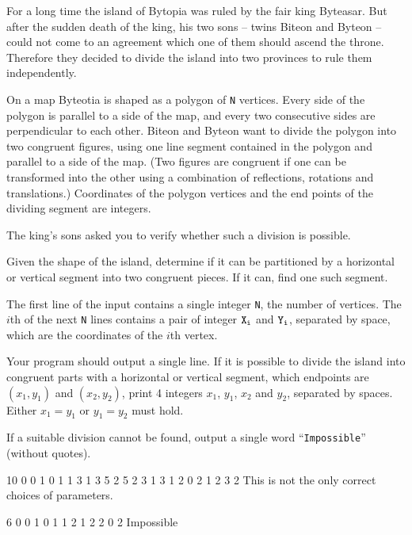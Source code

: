 \documentclass{boi2014}
\newcommand{\param}[1]{{\tt #1}}
\newcommand{\constant}[1]{{\tt #1}}
\newcommand{\N}{\param{N}}
\begin{document}
    For a long time the island of Bytopia was ruled by the fair king
    Byteasar. But after the sudden death
    of the king, his two sons -- twins Biteon and Byteon -- could
    not come to an agreement which one of them should ascend the throne.
    Therefore they decided to divide the island into two provinces to
    rule them independently.  
 
    On a map Byteotia is shaped as a polygon of \N{} vertices. Every
    side of the polygon is parallel to a side of the map, and every
    two consecutive sides are perpendicular to each other.  Biteon
    and Byteon want to divide the polygon into two congruent figures,
    using one line segment contained in the polygon and parallel to a
    side of the map.  (Two figures are congruent if one can be transformed
    into the other using a combination of reflections, rotations and
    translations.) Coordinates of the polygon vertices and the end points
    of the dividing segment are integers.  
 
    The king's sons asked you to verify whether such a division is
    possible.

    \Task

    Given the shape of the island, determine if it can be partitioned
    by a horizontal or vertical segment into two congruent pieces. If
    it can, find one such segment.

    \Input
	The first line of the input contains a single integer \N{}, the number of
	vertices. The $i$th of the next \N{} lines contains a pair of integer
	$\param{X_i}$ and $\param{Y_i}$, separated by space, which are the
	coordinates of the $i$th vertex.

	\Output
	Your program should output a single line. If it is possible to divide the
	island into congruent parts with a horizontal or vertical segment, which
	endpoints are $(x_1, y_1)$ and $(x_2, y_2)$, print 4 integers $x_1$,
	$y_1$, $x_2$ and $y_2$, separated by spaces.
	Either $x_1 = y_1$ or $y_1 = y_2$ must hold.

	If a suitable division cannot be found, output a single word
	``\constant{Impossible}'' (without quotes).

    \Examples
	\example
	{
		10
		0 0
		1 0
		1 1
		3 1
		3 5
		2 5
		2 3
		1 3
		1 2
		0 2
	}
	{
		1 2 3 2
	}
	{
		This is not the only correct choices of parameters.
	}

	\example
	{
		6
		0 0
		1 0
		1 1
		2 1
		2 2
		0 2
	}
	{
		Impossible
	}
\end{document}
